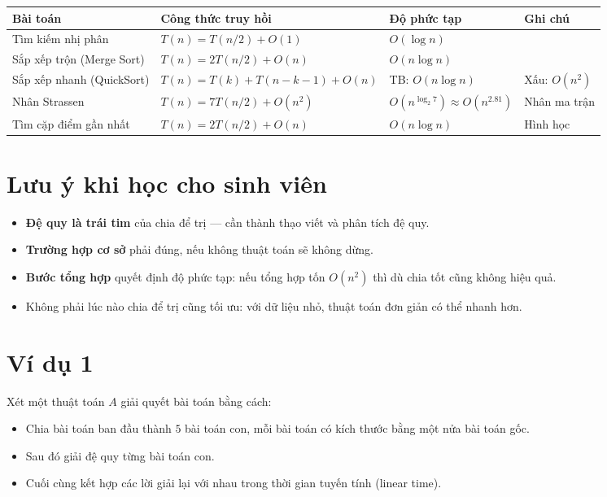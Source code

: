\documentclass{article}
\begin{document}
\begin{tabular}{|l|l|l|l|}
\hline
\textbf{Bài toán} & \textbf{Công thức truy hồi} & \textbf{Độ phức tạp} & \textbf{Ghi chú} \\
\hline
Tìm kiếm nhị phân & \(T(n) = T(n/2) + O(1)\) & \(O(\log n)\) & \\
\hline
Sắp xếp trộn (Merge Sort) & \(T(n) = 2T(n/2) + O(n)\) & \(O(n \log n)\) & \\
\hline
Sắp xếp nhanh (QuickSort) & \(T(n) = T(k) + T(n-k-1) + O(n)\) & TB: \(O(n \log n)\) & Xấu: \(O(n^2)\) \\
\hline
Nhân Strassen & \(T(n) = 7T(n/2) + O(n^2)\) & \(O(n^{\log_2 7}) \approx O(n^{2.81})\) & Nhân ma trận \\
\hline
Tìm cặp điểm gần nhất & \(T(n) = 2T(n/2) + O(n)\) & \(O(n \log n)\) & Hình học \\
\hline
\end{tabular}

\section{Lưu ý khi học cho sinh viên}

\begin{itemize}
    \item \textbf{Đệ quy là trái tim} của chia để trị — cần thành thạo viết và phân tích đệ quy.
    \item \textbf{Trường hợp cơ sở} phải đúng, nếu không thuật toán sẽ không dừng.
    \item \textbf{Bước tổng hợp} quyết định độ phức tạp: nếu tổng hợp tốn \(O(n^2)\) thì dù chia tốt cũng không hiệu quả.
    \item Không phải lúc nào chia để trị cũng tối ưu: với dữ liệu nhỏ, thuật toán đơn giản có thể nhanh hơn.
\end{itemize}


\section{Ví dụ 1}

Xét một thuật toán \(A\) giải quyết bài toán bằng cách:
\begin{itemize}
    \item Chia bài toán ban đầu thành \(5\) bài toán con, mỗi bài toán có kích thước bằng một nửa bài toán gốc.
    \item Sau đó giải đệ quy từng bài toán con.
    \item Cuối cùng kết hợp các lời giải lại với nhau trong thời gian tuyến tính (linear time).
\end{itemize}
\end{document}
